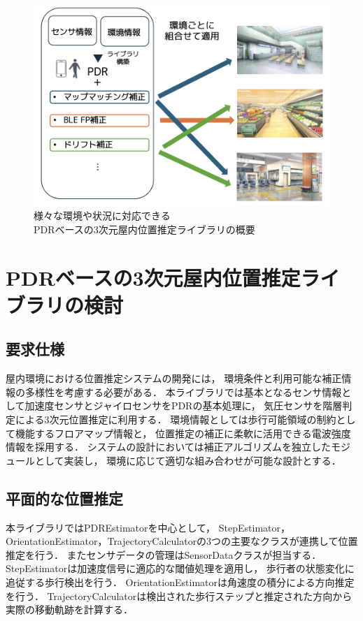 \documentclass[a4paper, 10pt, twocolumn]{jarticle}
\begin{document}
\begin{figure}[h]
	\centering
	\includegraphics[width=\linewidth]{image/first.png}
	\caption{様々な環境や状況に対応できる\\PDRベースの3次元屋内位置推定ライブラリの概要}    \label{fig:overview}
\end{figure}


\section{PDRベースの3次元屋内位置推定ライブラリの検討}


\subsection{要求仕様}
屋内環境における位置推定システムの開発には，
環境条件と利用可能な補正情報の多様性を考慮する必要がある．
本ライブラリでは基本となるセンサ情報として加速度センサとジャイロセンサをPDRの基本処理に，
気圧センサを階層判定による3次元位置推定に利用する．
環境情報としては歩行可能領域の制約として機能するフロアマップ情報と，
位置推定の補正に柔軟に活用できる電波強度情報を採用する．
システムの設計においては補正アルゴリズムを独立したモジュールとして実装し，
環境に応じて適切な組み合わせが可能な設計とする．


\subsection{平面的な位置推定}
本ライブラリではPDREstimatorを中心として，
StepEstimator，OrientationEstimator，TrajectoryCalculatorの3つの主要なクラスが連携して位置推定を行う．
またセンサデータの管理はSensorDataクラスが担当する．
StepEstimatorは加速度信号に適応的な閾値処理を適用し，
歩行者の状態変化に追従する歩行検出を行う．
OrientationEstimatorは角速度の積分による方向推定を行う．
TrajectoryCalculatorは検出された歩行ステップと推定された方向から実際の移動軌跡を計算する．
\end{document}

